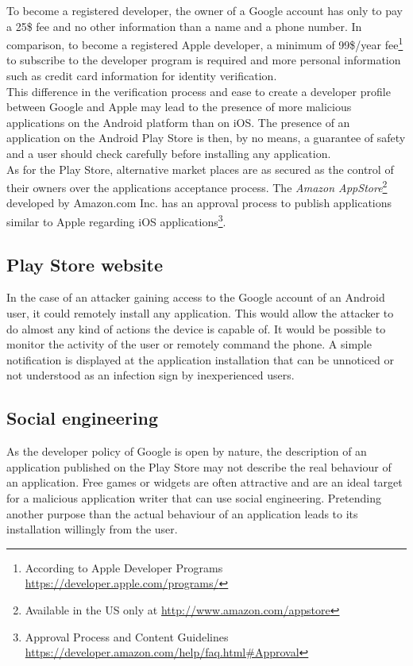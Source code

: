 To become a registered developer, the owner of a Google account has only to pay a 25\$ fee and no other information than a name and a phone number.
In comparison, to become a registered Apple developer, a minimum of 99\$/year fee\footnote{According to Apple Developer Programs \url{https://developer.apple.com/programs/}} to subscribe to the developer program is required and more personal information such as credit card information for identity verification.\\

This difference in the verification process and ease to create a developer profile between Google and Apple may lead to the presence of more malicious applications on the Android platform than on iOS.
The presence of an application on the Android Play Store is then, by no means, a guarantee of safety and a user should check carefully before installing any application.\\

As for the Play Store, alternative market places are as secured as the control of their owners over the applications acceptance process.
The \emph{Amazon AppStore}\footnote{Available in the US only at \url{http://www.amazon.com/appstore}} developed by Amazon.com Inc. has an approval process to publish applications similar to Apple regarding iOS applications\footnote{Approval Process and Content Guidelines \url{https://developer.amazon.com/help/faq.html\#Approval}}.

\subsection{Play Store website}

In the case of an attacker gaining access to the Google account of an Android user, it could remotely install any application.
This would allow the attacker to do almost any kind of actions the device is capable of.
It would be possible to monitor the activity of the user or remotely command the phone.
A simple notification is displayed at the application installation that can be unnoticed or not understood as an infection sign by inexperienced users.

\subsection{Social engineering}

As the developer policy of Google is open by nature, the description of an application published on the Play Store may not describe the real behaviour of an application.
Free games or widgets are often attractive and are an ideal target for a malicious application writer that can use social engineering.
Pretending another purpose than the actual behaviour of an application leads to its installation willingly from the user.\\

